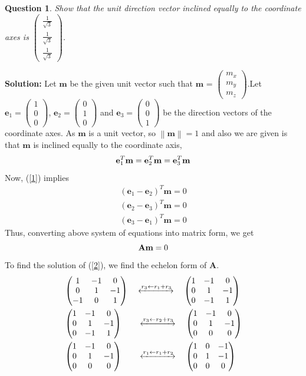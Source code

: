 \documentclass{article}
\newcommand{\solution}{\noindent \textbf{Solution: }}
\newtheorem{question}[theorem]{Question}
\newcommand{\myvec}[1]{\ensuremath{\begin{pmatrix}#1\end{pmatrix}}}
\newcommand{\norm}[1]{\left\lVert#1\right\rVert}
\let\vec\mathbf
\begin{document}
\begin{question}
	Show that the unit direction vector inclined equally to the coordinate axes is $\myvec{\frac{1}{\sqrt{3}} \\ \frac{1}{\sqrt{3}} \\ \frac{1}{\sqrt{3}}}$.
\end{question}
\solution Let $\vec{m}$ be the given unit vector such that $\vec{m}$ = $\myvec{m_x \\ m_y \\ m_z}$.Let $\vec{e}_1=\myvec{1 \\ 0 \\ 0}$, $\vec{e}_2=\myvec{0 \\ 1 \\ 0}$ and $\vec{e}_3=\myvec{0 \\ 0 \\ 1}$ be the direction vectors of the coordinate axes.
As $\vec{m}$ is a unit vector, so $\norm{\vec{m}} =1$ and also we are given is that $\vec{m}$ is inclined equally to the coordinate axis, 
\begin{equation}{\label{1}}
\vec{e}_1^T\vec{m} =\vec{e}_2^T\vec{m}=\vec{e}_3^T\vec{m}
\end{equation}
Now, (\ref{1}) implies 
\begin{align}
	(\vec{e}_1 -\vec{e}_2)^T\vec{m} = 0 \\
	(\vec{e}_2 -\vec{e}_3)^T\vec{m} = 0 \\
	(\vec{e}_3 -\vec{e}_1)^T\vec{m} = 0
\end{align}
Thus, converting above system of equations into matrix form, we get
\begin{equation}{\label{2}}
\vec{A}\vec{m} = 0
\end{equation}
To find the solution of (\ref{2}), we find the  echelon form of  $\vec{A}$.
\begin{align}
& \myvec{1 & -1 & 0 \\ 0 & 1 & -1 \\ -1 & 0 & 1 } \quad \xleftrightarrow[]{r_3 \leftarrow r_1 + r_3} \quad \myvec{1 & -1 & 0 \\ 0 & 1 & -1 \\ 0 & -1 & 1 } \\
& \myvec{1 & -1 & 0 \\ 0 & 1 & -1 \\ 0 & -1 & 1 } \qquad \xleftrightarrow[]{r_3 \leftarrow r_2 + r_3} \quad \myvec{1 & -1 & 0 \\ 0 & 1 & -1 \\ 0 & 0 & 0 } \\
& \myvec{1 &  -1 & 0 \\ 0 & 1 & -1 \\ 0 & 0 & 0 } \qquad \xleftrightarrow[]{r_1\leftarrow r_1+r_2} \quad  \myvec{1 &  0 & -1 \\ 0 & 1 & -1 \\ 0 & 0 & 0 }{\label{3}}
\end{align}
\end{document}
